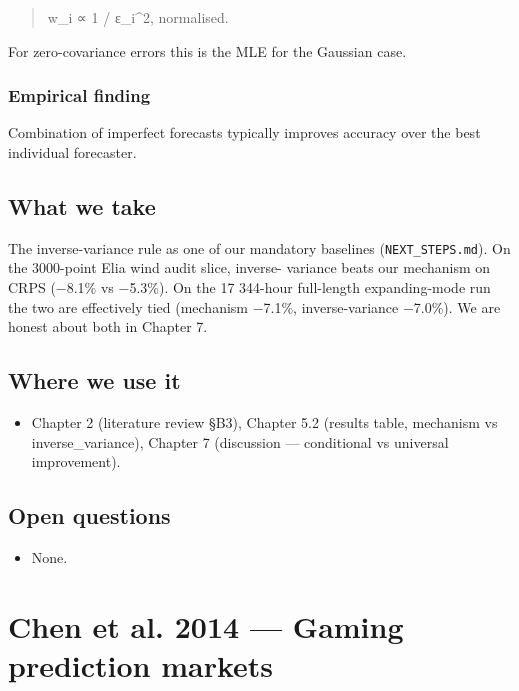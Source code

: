 \documentclass[11pt,a4paper,openany]{report}
\begin{document}
\begin{quote}
w\_i ∝ 1 / ε\_i\textasciicircum{}2, normalised.

\end{quote}
For zero-covariance errors this is the MLE for the Gaussian case.

\subsection{Empirical finding}

Combination of imperfect forecasts typically improves accuracy over
the best individual forecaster.

\section{What we take}

The inverse-variance rule as one of our mandatory baselines
(\texttt{NEXT\_STEPS.md}). On the 3000-point Elia wind audit slice, inverse-
variance beats our mechanism on CRPS (−8.1\% vs −5.3\%). On the
17 344-hour full-length expanding-mode run the two are effectively
tied (mechanism −7.1\%, inverse-variance −7.0\%). We are honest about
both in Chapter 7.

\section{Where we use it}

\begin{itemize}
  \item Chapter 2 (literature review §B3), Chapter 5.2 (results table,
    mechanism vs inverse\_variance), Chapter 7 (discussion — conditional
    vs universal improvement).
\end{itemize}

\section{Open questions}

\begin{itemize}
  \item None.
\end{itemize}

\chapter{Chen et al. 2014 — Gaming prediction markets}
\end{document}
